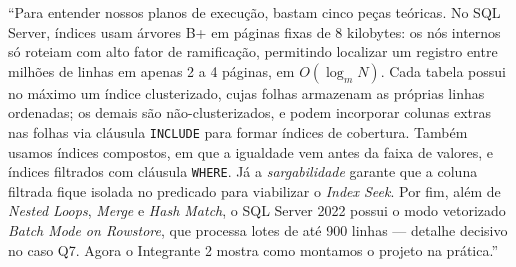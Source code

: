 \documentclass[10pt,a4paper]{article}
\begin{document}
\begin{falaBox}
``Para entender nossos planos de execução, bastam cinco peças teóricas. No SQL Server, índices usam árvores B+ em páginas fixas de 8 kilobytes: os nós internos só roteiam com alto fator de ramificação, permitindo localizar um registro entre milhões de linhas em apenas 2 a 4 páginas, em $O(\log_m N)$. Cada tabela possui no máximo um índice clusterizado, cujas folhas armazenam as próprias linhas ordenadas; os demais são não-clusterizados, e podem incorporar colunas extras nas folhas via cláusula \texttt{INCLUDE} para formar índices de cobertura. Também usamos índices compostos, em que a igualdade vem antes da faixa de valores, e índices filtrados com cláusula \texttt{WHERE}. Já a \emph{sargabilidade} garante que a coluna filtrada fique isolada no predicado para viabilizar o \emph{Index Seek}. Por fim, além de \emph{Nested Loops}, \emph{Merge} e \emph{Hash Match}, o SQL Server 2022 possui o modo vetorizado \emph{Batch Mode on Rowstore}, que processa lotes de até 900 linhas — detalhe decisivo no caso Q7. Agora o Integrante 2 mostra como montamos o projeto na prática.''
\end{falaBox}
\end{document}

